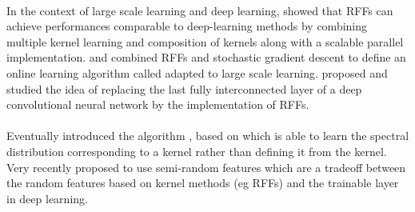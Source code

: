 \paragraph{}
In the context of large scale learning and deep learning, \citet{lu2014scale}
showed that \acsp{RFF} can achieve performances comparable to deep-learning
methods by combining multiple kernel learning and composition of kernels along
with a scalable parallel implementation.  and
\citet{xie2015scale} combined \acsp{RFF} and stochastic gradient descent to
define an online learning algorithm called  adapted to large scale learning.  proposed and
studied the idea of replacing the last fully interconnected layer of a deep
convolutional neural network \citep{lecun1995convolutional} by the
 implementation of \acsp{RFF}.
\paragraph{}
Eventually \citet{Yang2015} introduced the algorithm , based
on  which is able to learn the spectral distribution
corresponding to a kernel rather than defining it from the kernel. Very
recently \citet{kawaguchi2017deep} proposed to use semi-random features which
are a tradeoff between the random features based on kernel methods (\acs{eg}
\acsp{RFF}) and the trainable layer in deep learning.




\chapterend
